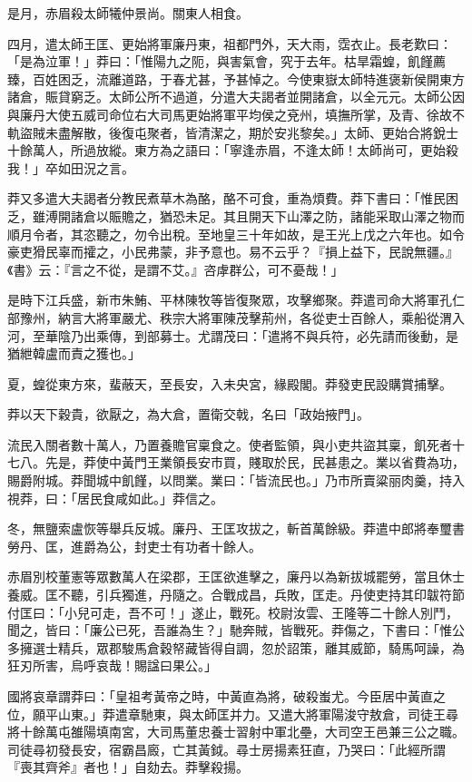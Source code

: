 \begin{pinyinscope}
是月，赤眉殺太師犧仲景尚。關東人相食。

四月，遣太師王匡、更始將軍廉丹東，祖都門外，天大雨，霑衣止。長老歎曰：「是為泣軍！」莽曰：「惟陽九之阨，與害氣會，究于去年。枯旱霜蝗，飢饉薦臻，百姓困乏，流離道路，于春尤甚，予甚悼之。今使東嶽太師特進褒新侯開東方諸倉，賑貸窮乏。太師公所不過道，分遣大夫謁者並開諸倉，以全元元。太師公因與廉丹大使五威司命位右大司馬更始將軍平均侯之兗州，填撫所掌，及青、徐故不軌盜賊未盡解散，後復屯聚者，皆清潔之，期於安兆黎矣。」太師、更始合將銳士十餘萬人，所過放縱。東方為之語曰：「寧逢赤眉，不逢太師！太師尚可，更始殺我！」卒如田況之言。

莽又多遣大夫謁者分教民煮草木為酪，酪不可食，重為煩費。莽下書曰：「惟民困乏，雖溥開諸倉以賑贍之，猶恐未足。其且開天下山澤之防，諸能采取山澤之物而順月令者，其恣聽之，勿令出稅。至地皇三十年如故，是王光上戊之六年也。如令豪吏猾民辜而攉之，小民弗蒙，非予意也。易不云乎？『損上益下，民說無疆。』《書》云：『言之不從，是謂不艾。』咨虖群公，可不憂哉！」

是時下江兵盛，新巿朱鮪、平林陳牧等皆復聚眾，攻擊鄉聚。莽遣司命大將軍孔仁部豫州，納言大將軍嚴尤、秩宗大將軍陳茂擊荊州，各從吏士百餘人，乘船從渭入河，至華陰乃出乘傳，到部募士。尤謂茂曰：「遣將不與兵符，必先請而後動，是猶紲韓盧而責之獲也。」

夏，蝗從東方來，蜚蔽天，至長安，入未央宮，緣殿閣。莽發吏民設購賞捕擊。

莽以天下穀貴，欲厭之，為大倉，置衛交戟，名曰「政始掖門」。

流民入關者數十萬人，乃置養贍官稟食之。使者監領，與小吏共盜其稟，飢死者十七八。先是，莽使中黃門王業領長安巿買，賤取於民，民甚患之。業以省費為功，賜爵附城。莽聞城中飢饉，以問業。業曰：「皆流民也。」乃巿所賣粱丽肉羹，持入視莽，曰：「居民食咸如此。」莽信之。

冬，無鹽索盧恢等舉兵反城。廉丹、王匡攻拔之，斬首萬餘級。莽遣中郎將奉璽書勞丹、匡，進爵為公，封吏士有功者十餘人。

赤眉別校董憲等眾數萬人在梁郡，王匡欲進擊之，廉丹以為新拔城罷勞，當且休士養威。匡不聽，引兵獨進，丹隨之。合戰成昌，兵敗，匡走。丹使吏持其印韍符節付匡曰：「小兒可走，吾不可！」遂止，戰死。校尉汝雲、王隆等二十餘人別鬥，聞之，皆曰：「廉公已死，吾誰為生？」馳奔賊，皆戰死。莽傷之，下書曰：「惟公多擁選士精兵，眾郡駿馬倉穀帑藏皆得自調，忽於詔策，離其威節，騎馬呵譟，為狂刃所害，烏呼哀哉！賜諡曰果公。」

國將哀章謂莽曰：「皇祖考黃帝之時，中黃直為將，破殺蚩尤。今臣居中黃直之位，願平山東。」莽遣章馳東，與太師匡并力。又遣大將軍陽浚守敖倉，司徒王尋將十餘萬屯雒陽填南宮，大司馬董忠養士習射中軍北壘，大司空王邑兼三公之職。司徒尋初發長安，宿霸昌廄，亡其黃鉞。尋士房揚素狂直，乃哭曰：「此經所謂『喪其齊斧』者也！」自劾去。莽擊殺揚。


\end{pinyinscope}
